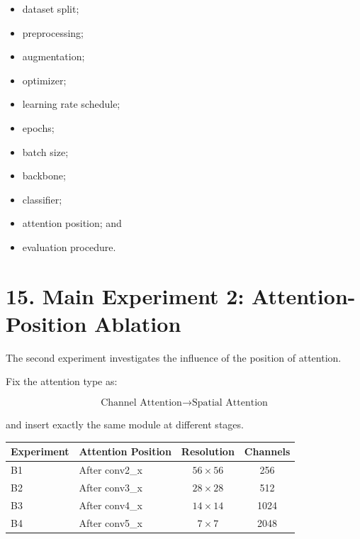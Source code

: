 \documentclass[10pt]{article}
\begin{document}
\begin{itemize}

\item dataset split;

\item preprocessing;

\item augmentation;

\item optimizer;

\item learning rate schedule;

\item epochs;

\item batch size;

\item backbone;

\item classifier;

\item attention position; and

\item evaluation procedure.

\end{itemize}

\section*{15. Main Experiment 2: Attention-Position Ablation}

The second experiment investigates the influence of the position of
attention.

Fix the attention type as:

\[
\boxed{
\text{Channel Attention}
\rightarrow
\text{Spatial Attention}
}
\]

and insert exactly the same module at different stages.

\begin{center}

\begin{tabular}{|l|l|c|c|}
\hline

\textbf{Experiment}
&
\textbf{Attention Position}
&
\textbf{Resolution}
&
\textbf{Channels}
\\
\hline

B1
&
After conv2\_x
&
$56\times56$
&
256
\\
\hline

B2
&
After conv3\_x
&
$28\times28$
&
512
\\
\hline

B3
&
After conv4\_x
&
$14\times14$
&
1024
\\
\hline

B4
&
After conv5\_x
&
$7\times7$
&
2048
\\
\hline

\end{tabular}

\end{center}
\end{document}
